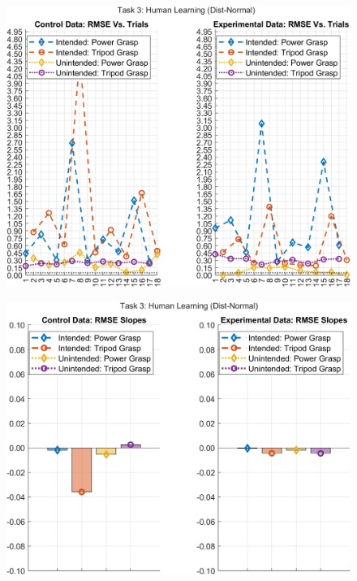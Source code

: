 \documentclass[12pt]{article}
\newcommand\figWidth{7in}
\begin{document}
\begin{figure}
    \includegraphics[width = \figWidth]{t3-rmse-dnorm.png}
\end{figure}
\begin{figure}
    \includegraphics[width = \figWidth]{t3-bar-dnorm.png}
\end{figure}
\end{document}
